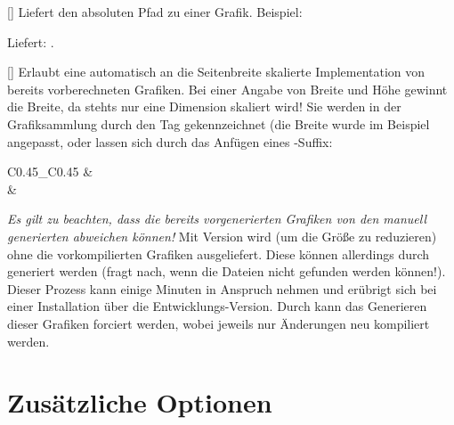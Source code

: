 []
Liefert den absoluten Pfad zu einer Grafik. Beispiel:
\begin{latex*}
\end{latex*}
Liefert: .

%
%
%

[]
Erlaubt eine automatisch an die Seitenbreite skalierte Implementation von bereits vorberechneten Grafiken. Bei einer Angabe von Breite und Höhe gewinnt die Breite, da stehts nur eine Dimension skaliert wird! Sie werden in der Grafiksammlung durch den Tag  gekennzeichnet (die Breite wurde im Beispiel angepasst, oder lassen sich durch das Anfügen eines -Suffix:
\begin{center}
    \begin{tabular}{C{0.45\linewidth}_C{0.45\linewidth}}
         &  \\
        {\tiny {}} & {\tiny{}}
    \end{tabular}
\end{center}
\emph{Es gilt zu beachten, dass die bereits vorgenerierten Grafiken von den manuell generierten abweichen können!}
Mit Version  wird \Jake (um die Größe zu reduzieren) ohne die vorkompilierten Grafiken ausgeliefert. Diese können allerdings durch  generiert werden (\Jake fragt nach, wenn die Dateien nicht gefunden werden können!). Dieser Prozess kann einige Minuten in Anspruch nehmen und erübrigt sich bei einer Installation über die Entwicklungs-Version. Durch  kann das Generieren dieser Grafiken forciert werden, wobei jeweils nur Änderungen neu kompiliert werden.

%
%
%
%
%

\section{Zusätzliche Optionen}

